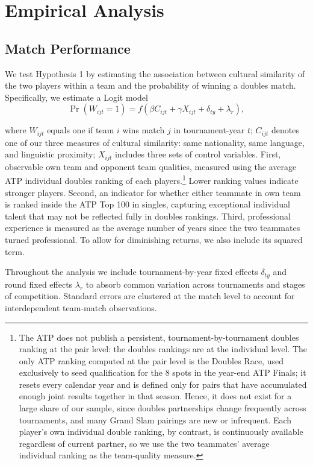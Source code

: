 \documentclass[10pt]{article}
\begin{document}
\section{Empirical Analysis}

\subsection{Match Performance}
We test Hypothesis 1 by  estimating the association between cultural similarity of the two players within a team and the probability of winning a doubles match. Specifically, we estimate a Logit model
\begin{equation}\label{matchoutcome}
  \operatorname{Pr}(W_{ijt} = 1) = f(\beta C_{ijt} + \gamma X_{ijt} + \delta_{ty} + \lambda_r) , 
\end{equation}


where $W_{ijt}$ equals one if team $i$ wins match $j$ in tournament-year $t$; $C_{ijt}$ denotes one of our three measures of cultural similarity: same nationality, same language, and linguistic proximity; 
$X_{ijt}$ includes three sets of control variables. First, observable own team and opponent team qualities, measured using the average ATP individual doubles ranking of each  players.\footnote{The ATP does not publish a persistent, tournament-by-tournament doubles ranking at the pair level: the doubles rankings are at the individual level. The only ATP ranking computed at the pair level is the  Doubles Race, used exclusively to seed qualification for the 8 spots in the year-end ATP Finals; it resets every calendar year and is defined only for pairs that have accumulated enough joint results together in that season. Hence, it does not exist for a large share of our sample, since doubles partnerships change frequently across tournaments, and many Grand Slam pairings are new or infrequent. Each player's own individual double ranking, by contrast, is continuously available regardless of current partner, so we use the two teammates' average individual ranking as the team-quality measure.} Lower ranking values indicate stronger players. Second, an indicator for whether either teammate in own team is ranked inside the ATP Top 100 in singles, capturing exceptional individual talent that may not be reflected fully in doubles rankings. Third, professional experience is measured as the average number of years since the two teammates turned professional. To allow for diminishing returns, we also include its squared term. 

Throughout the analysis we include tournament-by-year fixed effects $\delta_{ty}$ and round fixed effects $\lambda_r$ to absorb common variation across tournaments and stages of competition. Standard errors are clustered at the match level to account for interdependent team-match observations.
\end{document}
